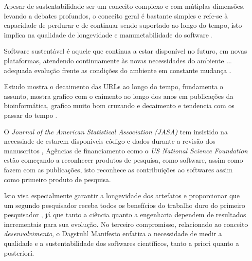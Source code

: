 Apesar de sustentabilidade ser um conceito complexo e com mútiplas dimensões,
levando a debates profundos, o conceito geral é bastante simples e refe-se à
capacidade de perdurar e de continuar sendo suportado ao longo do tempo, isto
implica na qualidade de longevidade e manunetabilidade do software
\cite{venters2014software}.

Software sustentável é aquele que continua a estar disponível no futuro, em
novas plataformas, atendendo continuamente às novas necessidades do ambiente
... adequada evolução frente as condições do ambiente em constante mudança
\cite{allen2017engineering}.

Estudo mostra o decaimento das URLs ao longo do tempo, fundamenta o assunto,
mostra grafico com o caimento ao longo dos anos em publicações da
bioinformática, grafico muito bom cruzando e decaimento e tendencia com os
passar do tempo \cite{wren2017use}.


O {\it Journal of the American Statistical Association (JASA)} tem insistido na
necessiade de estarem disponíveis código e dados durante a revisão dos
manuscritos \cite{baker2016scientists}, Agências de financiamento como o {\it
US National Science Foundation} estão começando a reconhecer produtos de
pesquisa, como software, assim como fazem com as publicações, isto reconhece as
contribuições ao softwares assim como primeiro produto de pesquisa.


Isto visa especialmente garantir a longevidade dos artefatos e proporcionar que
um segundo pesquisador receba todos os benefícios do trabalho duro do primeiro
pesquisador \cite{king1995replication}, já que tanto a ciência quanto a
engenharia dependem de resultados incrementais para sua evolução. No terceiro
compromisso, relacionado ao conceito {\it desenvolvimento}, o Dagstuhl
Manifesto enfatiza a necessidade de medir a qualidade e a sustentabilidade dos
softwares científicos, tanto a priori quanto a posteriori.

